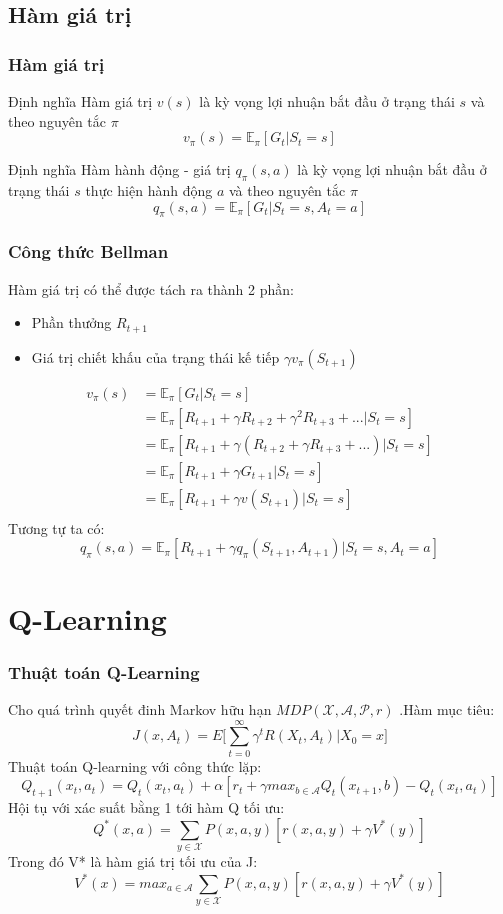 \documentclass{beamer}
\begin{document}
\subsection{Hàm giá trị}

\begin{frame}
\frametitle{Hàm giá trị}
\begin{block}{Định nghĩa}
Hàm giá trị $v(s)$ là kỳ vọng lợi nhuận bắt đầu ở trạng thái $s$ và theo nguyên tắc $\pi$
$$v_\pi (s)=\mathbb{E}_\pi [G_t|S_t=s]$$
\end{block}

\begin{block}{Định nghĩa}
Hàm hành động - giá trị $q_\pi (s,a)$ là kỳ vọng lợi nhuận bắt đầu ở trạng thái $s$ thực hiện hành động $a$ và theo nguyên tắc $\pi$
$$q_\pi (s,a)=\mathbb{E}_\pi [G_t|S_t=s,A_t=a]$$
\end{block}
\end{frame}

\begin{frame}
\frametitle{Công thức Bellman}
Hàm giá trị có thể được tách ra thành 2 phần:
\begin{itemize}
\item Phần thưởng $R_{t+1}$
\item Giá trị chiết khấu của trạng thái kế tiếp $\gamma v_\pi (S_{t+1})$
\end{itemize}
\begin{equation}
\begin{split}
v_\pi (s) & = \mathbb{E}_\pi [G_t|S_t = s] \\
& = \mathbb{E}_\pi [R_{t+1} + \gamma R_{t+2} + \gamma^2 R_{t+3} + ... | S_t = s] \\
& = \mathbb{E}_\pi [R_{t+1} + \gamma (R_{t+2} + \gamma R_{t+3} + ...) | S_t = s] \\
& = \mathbb{E}_\pi [R_{t+1} + \gamma G_{t+1} | S_t = s] \\
& = \mathbb{E}_\pi [R_{t+1} + \gamma v(S_{t+1}) | S_t = s] \\
\end{split}
\end{equation}
Tương tự ta có:
$$q_\pi (s,a) = \mathbb{E}_\pi [R_{t+1} + \gamma q_\pi (S_{t+1},A_{t+1}) | S_t = s, A_t =a]$$
\end{frame}

\section{Q-Learning}
\begin{frame}
\frametitle{Thuật toán Q-Learning}

Cho quá trình quyết đinh Markov hữu hạn $MDP(\mathcal{X},\mathcal{A},\mathcal{P},r)$
.Hàm mục tiêu:
$$J(x,{A_t})=E\big[ \sum_{t=0}^\infty{\gamma^t R(X_t,A_t)|X_0=x} \big]$$
Thuật toán Q-learning với công thức lặp:
$$Q_{t+1}(x_t,a_t)=Q_t(x_t,a_t)+\alpha[r_t +\gamma max_{b \in \mathcal{A}}Q_t(x_{t+1},b)-Q_t(x_t,a_t)]$$
Hội tụ với xác suất bằng 1 tới hàm Q tối ưu:
$$Q^*(x,a)=\sum_{y\in\mathcal{X}}{P(x,a,y)[r(x,a,y)+\gamma V^*(y)]}$$
Trong đó V* là hàm giá trị tối ưu của J:
$$V^*(x)=max_{a\in\mathcal{A}}\sum_{y\in\mathcal{X}}{P(x,a,y)[r(x,a,y)+\gamma V^*(y)]}$$

\end{frame}
\end{document}
